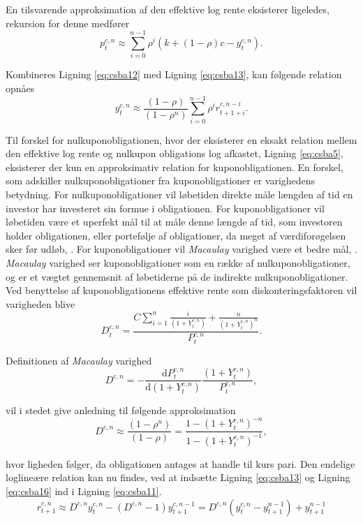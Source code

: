\documentclass[
  a4paper,
  oneside]{memoir}
\begin{document}
En tilsvarende approksimation af den effektive log rente eksisterer ligeledes, rekursion for denne medfører
\begin{equation}
p_t^{c,n}\approx\sum_{i=0}^{n-1} \rho^i \left(k+(1-\rho)c - y_{t}^{c,n}\right). \label{eq:csba13}
\end{equation}

Kombineres Ligning \eqref{eq:csba12} med Ligning \eqref{eq:csba13}, kan følgende relation opnåes
\begin{equation}
y_{t}^{c,n}\approx \frac{(1-\rho)}{(1-\rho^n)}\sum_{i=0}^{n-1} \rho^i r_{t+1+i}^{c,n-i}. \label{eq:csba14}
\end{equation}

Til forskel for nulkuponobligationen, hvor der eksisterer en eksakt relation mellem den effektive log rente og nulkupon obligations log afkastet, Ligning \eqref{eq:csba5}, eksisterer der kun en approksimativ relation for kuponobligationen. En forskel, som adskiller nulkuponobligationer fra kuponobligationer er varighedens betydning. For nulkuponobligationer vil løbetiden direkte måle længden af tid en investor har investeret sin formue i obligationen. For kuponobligationer vil løbetiden være et uperfekt mål til at måle denne længde af tid, som investoren holder obligationen, eller portefølje af obligationer, da meget af værdiforøgelsen sker før udløb, \citep{Campbell1997}. For kuponobligationer vil \emph{Macaulay} varighed være et bedre mål, \citep{Macaulay1938}. \emph{Macaulay} varighed ser kuponobligationer som en række af nulkuponobligationer, og er et vægtet gennemsnit af løbetiderne på de indirekte nulkuponobligationer. Ved benyttelse af kuponobligationens effektive rente som diskonteringsfaktoren vil varigheden blive
\begin{equation}
D_t^{c,n}=\frac{C\sum_{i=1}^n \frac{i}{(1+Y_t^{c,n})} + \frac{n}{(1+Y_t^{c,n})^n}}{P_t^{c,n}}. \label{eq:csba15}
\end{equation}

Definitionen af \emph{Macaulay} varighed
\[D^{c,n}=-\frac{\text{d} P_t^{c,n}}{\text{d} (1+Y_t^{c,n})}\frac{(1+Y_t^{c,n})}{P_t^{c,n}},\]

vil i stedet give anledning til følgende approksimation
\begin{equation}
D^{c,n}\approx \frac{(1-\rho^n)}{(1-\rho)} = \frac{1-(1+Y_t^{c,n})^{-n}}{1-(1+Y_t^{c,n})^{-1}}, \label{eq:csba16}
\end{equation}

hvor ligheden følger, da obligationen antages at handle til kurs pari. Den endelige loglineære relation kan nu findes, ved at indsætte Ligning \eqref{eq:csba13} og Ligning \eqref{eq:csba16} ind i Ligning \eqref{eq:csba11}.
\begin{equation}
r_{t+1}^{c,n}\approx D^{c,n} y_t^{c,n} - \left(D^{c,n} - 1\right) y_{t+1}^{c,n-1}=D^{c,n}(y_t^{c,n}- y_{t+1}^{n-1}) + y_{t+1}^{n-1}  \label{eq:csba17}
\end{equation}
\end{document}
